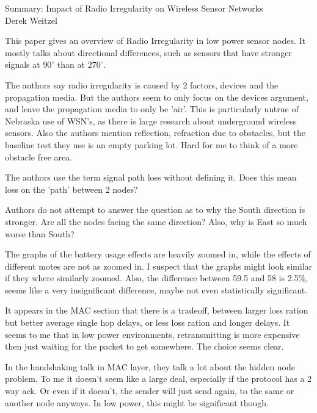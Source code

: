 \documentclass[12pt]{article}
\begin{document}
\begin{center}
{\huge Summary: Impact of Radio Irregularity on Wireless Sensor Networks } \\
Derek Weitzel
\end{center}

This paper gives an overview of Radio Irregularity in low power sensor nodes.  It mostly talks about directional differences, such as sensors that have stronger signals at $90^{\circ}$ than at $270^{\circ}$.

The authors say radio irregularity is caused by 2 factors, devices and the propagation media.  But the authors seem to only focus on the devices argument, and leave the propagation media to only be 'air'.  This is particularly untrue of Nebraska use of WSN's, as there is large research about underground wireless sensors.  Also the authors mention reflection, refraction due to obstacles, but the baseline test they use is an empty parking lot.  Hard for me to think of a more obstacle free area.

The authors use the term signal path loss without defining it.  Does this mean loss on the 'path' between 2 nodes?

Authors do not attempt to answer the question as to why the South direction is stronger.  Are all the nodes facing the same direction?  Also, why is East so much worse than South?

The graphs of the battery usage effects are heavily zoomed in, while the effects of different motes are not as zoomed in.  I suspect that the graphs might look similar if they where similarly zoomed.  Also, the difference between 59.5 and 58 is 2.5\%, seems like a very insignificant difference, maybe not even statistically significant.

It appears in the MAC section that there is a tradeoff, between larger loss ration but better average single hop delays, or less loss ration and longer delays.  It seems to me that in low power environments, retransmitting is more expensive then just waiting for the packet to get somewhere.  The choice seems clear.

In the handshaking talk in MAC layer, they talk a lot about the hidden node problem.  To me it doesn't seem like a large deal, especially if the protocol has a 2 way ack.  Or even if it doesn't, the sender will just send again, to the same or another node anyways.  In low power, this might be significant though.
\end{document}
